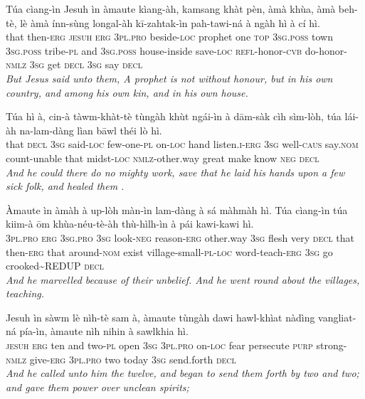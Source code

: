 \documentclass[11pt,a4paper]{article}
\begin{document}
\begin{exe}
\gll Túa cìang-ìn Jesuh ìn àmaute kìang-àh, kamsang khàt pèn, àmà khùa, àmà beh-tè, lè àmà ínn-sùng longal-àh kī-zahtak-ìn pah-tawi-ná à ngàh hì à cí hì. \\
     that then-\textsc{erg} \textsc{jesuh} \textsc{erg} \textsc{3pl}.\textsc{pro} beside-\textsc{loc} prophet one \textsc{top} \textsc{3sg}.\textsc{poss} town \textsc{3sg}.\textsc{poss} tribe-\textsc{pl} and \textsc{3sg}.\textsc{poss} house-inside save-\textsc{loc} \textsc{refl}-honor-\textsc{cvb} do-honor-\textsc{nmlz} \textsc{3sg} get \textsc{decl} \textsc{3sg} say \textsc{decl} \\
\glt \textcolor{kjvcolor}{\textit{But Jesus said unto them, A prophet is not without honour, but in his own country, and among his own kin, and in his own house.}}

\gll Túa hì à, cin-à tàwm-khàt-tè tùngàh khùt ngái-ìn à dām-sàk cìh sìm-lòh, túa lái-àh na-lam-dàng lìan bāwl théi lò hì. \\
     that \textsc{decl} \textsc{3sg} said-\textsc{loc} few-one-\textsc{pl} on-\textsc{loc} hand listen.\textsc{i}-\textsc{erg} \textsc{3sg} well-\textsc{caus} say.\textsc{nom} count-unable that midst-\textsc{loc} \textsc{nmlz}-other.way great make know \textsc{neg} \textsc{decl} \\
\glt \textcolor{kjvcolor}{\textit{And he could there do no mighty work, save that he laid his hands upon a few sick folk, and healed them .}}

\gll Àmaute ìn àmàh à up-lòh màn-ìn lam-dàng à sá màhmàh hì. Túa cìang-ìn túa kiim-à ōm khùa-néu-tè-àh thù-hìlh-ìn à pái kawi-kawi hì. \\
     \textsc{3pl}.\textsc{pro} \textsc{erg} \textsc{3sg}.\textsc{pro} \textsc{3sg} look-\textsc{neg} reason-\textsc{erg} other.way \textsc{3sg} flesh very \textsc{decl} that then-\textsc{erg} that around-\textsc{nom} exist village-small-\textsc{pl}-\textsc{loc} word-teach-\textsc{erg} \textsc{3sg} go crooked\textasciitilde{}REDUP \textsc{decl} \\
\glt \textcolor{kjvcolor}{\textit{And he marvelled because of their unbelief. And he went round about the villages, teaching.}}

\gll Jesuh ìn sàwm lè nìh-tè sam à, àmaute tùngàh dawi hawl-khìat nàdìng vangliat-ná pía-ìn, àmaute nìh nihin à sawlkhia hì. \\
     \textsc{jesuh} \textsc{erg} ten and two-\textsc{pl} open \textsc{3sg} \textsc{3pl}.\textsc{pro} on-\textsc{loc} fear persecute \textsc{purp} strong-\textsc{nmlz} give-\textsc{erg} \textsc{3pl}.\textsc{pro} two today \textsc{3sg} send.forth \textsc{decl} \\
\glt \textcolor{kjvcolor}{\textit{And he called unto him the twelve, and began to send them forth by two and two; and gave them power over unclean spirits;}}


\end{exe}
\end{document}
